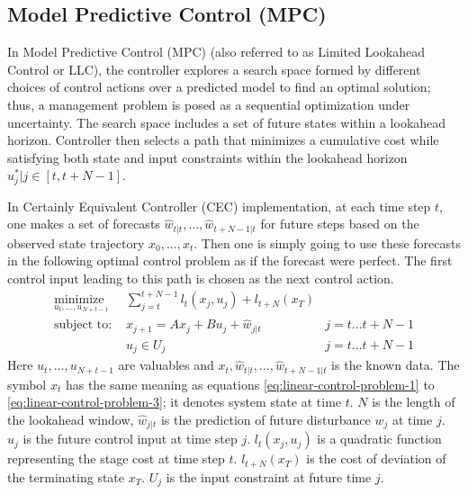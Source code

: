  \subsection{Model Predictive Control (MPC)} 
In Model Predictive Control (MPC) (also referred to as Limited Lookahead Control or LLC)\cite{abdelwahed2004control, kandasamy2004self}, the controller explores a search space formed by different choices of control actions over a predicted model \cite{bhat2006enabling} to find an optimal solution; thus, a management problem is posed as a sequential optimization under uncertainty. 
The search space includes a set of future states within a lookahead horizon. Controller then selects a path that minimizes a cumulative cost while satisfying both state and input constraints within the lookahead horizon
$u^*_j|j\in [t , t + N-1]$. 

In Certainly Equivalent Controller (CEC)  implementation,  at each time step $t$, one
 makes a set of forecasts $\hat{w}_{t|t} ,\ldots,\hat{w}_{t+N-1|t}$ for future steps based on the observed state trajectory $x_{0},...,x_{t}$. 
 Then one is simply going to use these forecasts in the following optimal control problem as if the forecast were perfect. The first control input leading to this path is chosen as the next control action.
\begin{align} 
    \underset{u_t,...,u_{N+t-1}} {\text{minimize } }  &  \sum_{j=t}^{t+N-1} l_t(x_j,u_j) + l_{t+N}(x_T)  \label{eq:mpc-control-problem-1}   \\ 
    \text{subject to: } 
    & x_{j+1}=A x_{j}+B u_j + \hat{w}_{j|t} & j=t...t+N-1  \label{eq:mpc-control-problem-2}   \\
    & u_j\in U_j   & j=t...t+N-1  \label{eq:mpc-control-problem-3}  
\end{align}        
 Here $u_t,\ldots,u_{N+t-1}$ are valuables and $x_t, \hat{w}_{t|t} ,\ldots,\hat{w}_{t+N-1|t} $  is the known data. The symbol $x_t$ has the same meaning as equations  \ref{eq:linear-control-problem-1}  to \ref{eq:linear-control-problem-3}; it denotes system state at time $t$. $N$ is the length of the lookahead window, $\hat{w}_{j|t}$  is the prediction of future disturbance $w_{j}$ at time $j$. $u_j$ is the future control input at time step $j$. $l_t(x_j,u_j)$ is a quadratic function representing the stage cost at time step $t$. $l_{t+N}(x_T)$ is the cost of deviation of the terminating state $x_T$. $U_j$ is the input constraint at future time $j$.  

